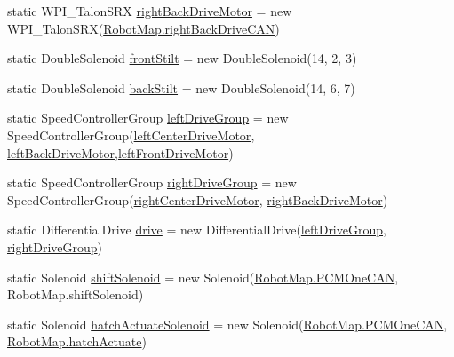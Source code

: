 \begin{DoxyCompactItemize}
\item 
static W\+P\+I\+\_\+\+Talon\+S\+RX \hyperlink{classfrc_1_1robot_1_1_o_i_a5f2937beffdc7dd1d937aaff36f20c1e}{right\+Back\+Drive\+Motor} = new W\+P\+I\+\_\+\+Talon\+S\+RX(\hyperlink{classfrc_1_1robot_1_1_robot_map_a0fb2fff6bf26e3f196d1cb02a89072c3}{Robot\+Map.\+right\+Back\+Drive\+C\+AN})
\item 
static Double\+Solenoid \hyperlink{classfrc_1_1robot_1_1_o_i_a4f6b2dd823bad92cfaf2e9ecc7c0b1ca}{front\+Stilt} = new Double\+Solenoid(14, 2, 3)
\item 
static Double\+Solenoid \hyperlink{classfrc_1_1robot_1_1_o_i_a89667abb08d7721a47088f0218fd5afa}{back\+Stilt} = new Double\+Solenoid(14, 6, 7)
\item 
static Speed\+Controller\+Group \hyperlink{classfrc_1_1robot_1_1_o_i_a6d76241e542ab271366e4cb4bf7b5133}{left\+Drive\+Group} = new Speed\+Controller\+Group(\hyperlink{classfrc_1_1robot_1_1_o_i_a8c33a9f0b9e366e48abd23ab01907e18}{left\+Center\+Drive\+Motor}, \hyperlink{classfrc_1_1robot_1_1_o_i_a88080d092baf8ece2c22f2ceec4f6f8f}{left\+Back\+Drive\+Motor},\hyperlink{classfrc_1_1robot_1_1_o_i_a3f39e281419ebd60b94126e87e3ec81d}{left\+Front\+Drive\+Motor})
\item 
static Speed\+Controller\+Group \hyperlink{classfrc_1_1robot_1_1_o_i_a1595c2b8ebd7e4e467027b2eb21983ee}{right\+Drive\+Group} = new Speed\+Controller\+Group(\hyperlink{classfrc_1_1robot_1_1_o_i_a9be3279c18d1f3433d6b07c706eb1457}{right\+Center\+Drive\+Motor}, \hyperlink{classfrc_1_1robot_1_1_o_i_a5f2937beffdc7dd1d937aaff36f20c1e}{right\+Back\+Drive\+Motor})
\item 
static Differential\+Drive \hyperlink{classfrc_1_1robot_1_1_o_i_a8527ec31aa37a3ff523e5ba857aba46f}{drive} = new Differential\+Drive(\hyperlink{classfrc_1_1robot_1_1_o_i_a6d76241e542ab271366e4cb4bf7b5133}{left\+Drive\+Group}, \hyperlink{classfrc_1_1robot_1_1_o_i_a1595c2b8ebd7e4e467027b2eb21983ee}{right\+Drive\+Group})
\item 
static Solenoid \hyperlink{classfrc_1_1robot_1_1_o_i_a63a56e8585378f6afe6f45facc98f494}{shift\+Solenoid} = new Solenoid(\hyperlink{classfrc_1_1robot_1_1_robot_map_a79a848df56d706c787d9a4f9a0434e7f}{Robot\+Map.\+P\+C\+M\+One\+C\+AN}, Robot\+Map.\+shift\+Solenoid)
\item 
static Solenoid \hyperlink{classfrc_1_1robot_1_1_o_i_a232ad4f80d75cd3d48c2067251c59817}{hatch\+Actuate\+Solenoid} = new Solenoid(\hyperlink{classfrc_1_1robot_1_1_robot_map_a79a848df56d706c787d9a4f9a0434e7f}{Robot\+Map.\+P\+C\+M\+One\+C\+AN}, \hyperlink{classfrc_1_1robot_1_1_robot_map_a7bec1963c7590911eb30697b0707d9b4}{Robot\+Map.\+hatch\+Actuate})

\end{DoxyCompactItemize}
